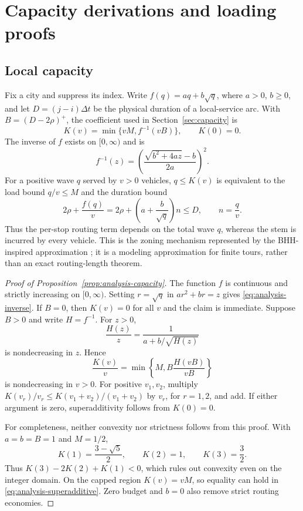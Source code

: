 \section{Capacity derivations and loading proofs}
\label{app:proofs}

\subsection{Local capacity}

Fix a city and suppress its index. Write $f(q)=aq+b\sqrt q$, where $a>0$,
$b\ge0$, and let $D=(j-i)\Delta t$ be the physical duration of a local-service
arc. With $B=(D-2\rho)^+$, the coefficient used in
Section~\ref{sec:capacity} is
\begin{equation}
 K(v)=\min\{vM,f^{-1}(vB)\},\qquad K(0)=0.
 \label{eq:analysis-capacity}
\end{equation}
The inverse of $f$ exists on $[0,\infty)$ and is
\begin{equation}
 f^{-1}(z)=\left(\frac{\sqrt{b^2+4az}-b}{2a}\right)^2.
 \label{eq:analysis-inverse}
\end{equation}
For a positive wave $q$ served by $v>0$ vehicles, $q\le K(v)$ is equivalent to
the load bound $q/v\le M$ and the duration bound
\begin{equation}
 2\rho+\frac{f(q)}v
 =2\rho+\left(a+\frac b{\sqrt q}\right)n\le D,
 \qquad n=\frac qv.
 \label{eq:analysis-local-bridge}
\end{equation}
Thus the per-stop routing term depends on the total wave $q$, whereas the stem
is incurred by every vehicle. This is the zoning mechanism represented by the
BHH-inspired approximation \cite{Beardwood1959}; it is a modeling approximation
for finite tours, rather than an exact routing-length theorem.

\begin{proof}[Proof of Proposition~\ref{prop:analysis-capacity}]
The function $f$ is continuous and strictly increasing on $[0,\infty)$.
Setting $r=\sqrt q$ in $ar^2+br=z$ gives
\eqref{eq:analysis-inverse}. If $B=0$, then $K(v)=0$ for all $v$ and the
claim is immediate. Suppose $B>0$ and write $H=f^{-1}$. For $z>0$,
\[
 \frac{H(z)}z=\frac1{a+b/\sqrt{H(z)}}
\]
is nondecreasing in $z$. Hence
\[
 \frac{K(v)}v=\min\left\{M,
                  B\frac{H(vB)}{vB}\right\}
\]
is nondecreasing in $v>0$. For positive $v_1,v_2$, multiply
$K(v_r)/v_r\le K(v_1+v_2)/(v_1+v_2)$ by $v_r$, for $r=1,2$, and add.
If either argument is zero, superadditivity follows from $K(0)=0$.

For completeness, neither convexity nor strictness follows from this proof.
With $a=b=B=1$ and $M=1/2$,
\[
 K(1)=\frac{3-\sqrt5}2,\qquad K(2)=1,\qquad K(3)=\frac32.
\]
Thus $K(3)-2K(2)+K(1)<0$, which rules out convexity even on the integer
domain. On the capped region $K(v)=vM$, so equality can hold in
\eqref{eq:analysis-superadditive}. Zero budget and $b=0$ also remove strict
routing economies.
\end{proof}


